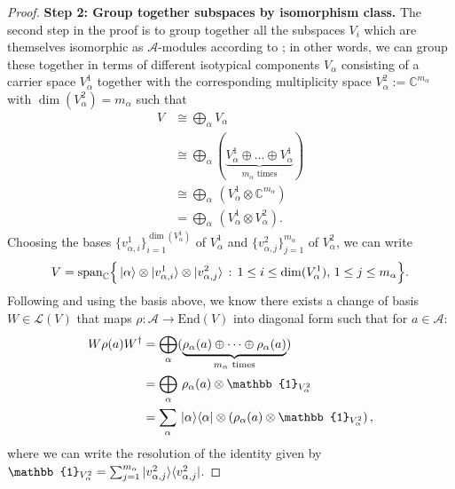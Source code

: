 \begin{proof}
\textbf{Step 2: Group together subspaces by isomorphism class.} The second step in the proof is to group together all the subspaces $V_i$ which are themselves isomorphic as $\mathcal{A}$-modules according to ; in other words, we can group these together in terms of different isotypical components $V_\alpha$ consisting of a carrier space $V_\alpha^1$ together with the corresponding multiplicity space $V_\alpha^2 := \mathbb{C}^{m_\alpha}$ with $\dim(V_\alpha^2)=m_\alpha$ such that
\begin{align}
V & \cong \bigoplus_\alpha V_\alpha\\
&\cong\bigoplus_\alpha (\underbrace{V_\alpha^1 \oplus \dots \oplus V_\alpha^1}_{m_\alpha \text{ times}})\\
&\cong \bigoplus_\alpha \, (V_\alpha^1 \otimes \mathbb{C}^{m_\alpha})\\
&= \bigoplus_\alpha \, (V^1_\alpha \otimes V^2_\alpha).
\end{align}
Choosing the bases $\{v_{\alpha,i}^1\}_{i=1}^{\dim(V_\alpha^1)}$ of $V_\alpha^1$ and $\{v_{\alpha,j}^2\}_{j=1}^{m_\alpha}$ of $V_\alpha^2$, we can write
$$
V = \mathrm{span}_{\mathbb{C}}\Big\{\ket{\alpha} \otimes \ket{v_{\alpha,i}^1} \otimes \ket{v_{\alpha,j}^2} \, : \,  1 \leq i \leq \dim(V_\alpha^1), \, 1 \leq j \leq m_\alpha\Big\}.
$$
Following  and using the basis above, we know there exists a change of basis $W \in \mathcal{L}(V)$ that maps $\rho: \mathcal{A} \rightarrow \mathrm{End}(V)$ into diagonal form such that for $a \in \mathcal{A}$:
\begin{align}
W\rho(a)W^\dag &=\bigoplus_\alpha (\underbrace{\rho_{\alpha}(a) \oplus \dots \oplus \rho_{\alpha}(a)}_{m_\alpha \text{ times}})\\
&=\bigoplus_{\alpha} \, \rho_{\alpha}(a) \otimes \mathbb{1}_{V_\alpha^2}\\
&=\sum_{\alpha} \,\proj{\alpha} \otimes (\rho_{\alpha}(a) \otimes \mathbb{1}_{V_\alpha^2}) \, ,
\end{align}
where we can write the resolution of the identity given by $\mathbb{1}_{V_\alpha^2} = \sum_{j=1}^{m_\alpha} \proj{v_{\alpha,j}^2}$. 



\end{proof}
